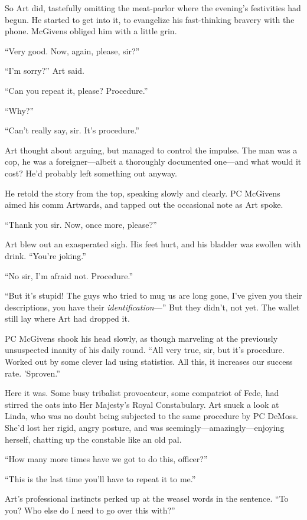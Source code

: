 So Art did, tastefully omitting the meat-parlor where the evening’s
festivities had begun. He started to get into it, to evangelize his
fast-thinking bravery with the phone. McGivens obliged him with a
little grin.

“Very good. Now, again, please, sir?”

“I’m sorry?” Art said.

“Can you repeat it, please? Procedure.”

“Why?”

“Can’t really say, sir. It’s procedure.”

Art thought about arguing, but managed to control the impulse. The
man was a cop, he was a foreigner—albeit a thoroughly documented
one—and what would it cost? He’d probably left something out
anyway.

He retold the story from the top, speaking slowly and clearly. PC
McGivens aimed his comm Artwards, and tapped out the occasional
note as Art spoke.

“Thank you sir. Now, once more, please?”

Art blew out an exasperated sigh. His feet hurt, and his bladder
was swollen with drink. “You’re joking.”

“No sir, I’m afraid not. Procedure.”

“But it’s stupid! The guys who tried to mug us are long gone, I’ve
given you their descriptions, you have their
\emph{identification}—” But they didn’t, not yet. The wallet still
lay where Art had dropped it.

PC McGivens shook his head slowly, as though marveling at the
previously unsuspected inanity of his daily round. “All very true,
sir, but it’s procedure. Worked out by some clever lad using
statistics. All this, it increases our success rate. ’Sproven.”

Here it was. Some busy tribalist provocateur, some compatriot of
Fede, had stirred the oats into Her Majesty’s Royal Constabulary.
Art snuck a look at Linda, who was no doubt being subjected to the
same procedure by PC DeMoss. She’d lost her rigid, angry posture,
and was seemingly—amazingly—enjoying herself, chatting up the
constable like an old pal.

“How many more times have we got to do this, officer?”

“This is the last time you’ll have to repeat it to me.”

Art’s professional instincts perked up at the weasel words in the
sentence. “To you? Who else do I need to go over this with?”

